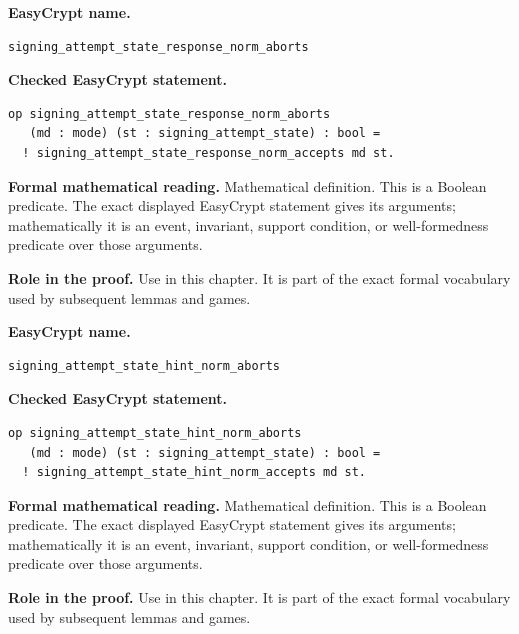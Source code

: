 \begin{formaldefinition}
\noindent\textbf{EasyCrypt name.}
\begin{lstlisting}[language=EasyCrypt,basicstyle=\ttfamily\scriptsize]
signing_attempt_state_response_norm_aborts
\end{lstlisting}
\noindent\textbf{Checked EasyCrypt statement.}
\begin{lstlisting}[language=EasyCrypt,basicstyle=\ttfamily\scriptsize]
op signing_attempt_state_response_norm_aborts
   (md : mode) (st : signing_attempt_state) : bool =
  ! signing_attempt_state_response_norm_accepts md st.
\end{lstlisting}
\noindent\textbf{Formal mathematical reading.}
Mathematical definition. This is a Boolean predicate.  The exact displayed EasyCrypt statement gives its arguments; mathematically it is an event, invariant, support condition, or well-formedness predicate over those arguments.

\noindent\textbf{Role in the proof.}
Use in this chapter. It is part of the exact formal vocabulary used by subsequent lemmas and games.

\end{formaldefinition}

\begin{formaldefinition}
\noindent\textbf{EasyCrypt name.}
\begin{lstlisting}[language=EasyCrypt,basicstyle=\ttfamily\scriptsize]
signing_attempt_state_hint_norm_aborts
\end{lstlisting}
\noindent\textbf{Checked EasyCrypt statement.}
\begin{lstlisting}[language=EasyCrypt,basicstyle=\ttfamily\scriptsize]
op signing_attempt_state_hint_norm_aborts
   (md : mode) (st : signing_attempt_state) : bool =
  ! signing_attempt_state_hint_norm_accepts md st.
\end{lstlisting}
\noindent\textbf{Formal mathematical reading.}
Mathematical definition. This is a Boolean predicate.  The exact displayed EasyCrypt statement gives its arguments; mathematically it is an event, invariant, support condition, or well-formedness predicate over those arguments.

\noindent\textbf{Role in the proof.}
Use in this chapter. It is part of the exact formal vocabulary used by subsequent lemmas and games.

\end{formaldefinition}


